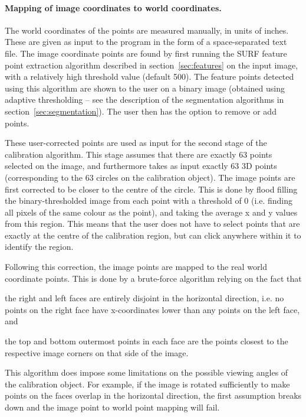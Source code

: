 \paragraph{Mapping of image coordinates to world coordinates.}
The world coordinates of the points are measured manually, in units of
inches. These are given as input to the program in the form of a
space-separated text file. The image coordinate points are found by
first running the SURF feature point extraction algorithm described in
section~\ref{sec:features} on the input image, with a relatively high
threshold value (default 500). The feature points detected using this
algorithm are shown to the user on a binary image (obtained using
adaptive thresholding -- see the description of the segmentation
algorithms in section~\ref{sec:segmentation}). The user then has the option
to remove or add points.

These user-corrected points are used as input for the second stage of the
calibration algorithm. This stage assumes that there are exactly 63
points selected on the image, and furthermore takes as input exactly
63 3D points (corresponding to the 63 circles on the calibration
object). The image points are first corrected to be closer to the
centre of the circle. This is done by flood filling the binary-thresholded image
from each point with a threshold of 0 (i.e. finding all pixels of the
same colour as the point), and taking the average x and y values from
this region. This means that the user does not have to select points
that are exactly at the centre of the calibration region, but can
click anywhere within it to identify the region.

Following this correction, the image points are mapped to the real
world coordinate points. This is done by a brute-force algorithm
relying on the fact that
\begin{inparaenum}[(a)]
  \item the right and left faces are entirely disjoint in the
    horizontal direction, i.e. no points on the right face have
    x-coordinates lower than any points on the left face, and
  \item the top and bottom outermost points in each face are the
    points closest to the respective image corners on that side of the
    image.
\end{inparaenum}
This algorithm does impose some limitations on the possible viewing
angles of the calibration object. For example, if the image is rotated
sufficiently to make points on the faces overlap in the horizontal direction, the
first assumption breaks down and the image point to world point
mapping will fail.

